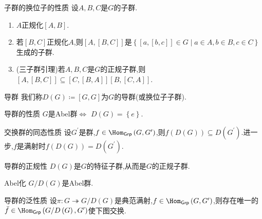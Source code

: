 \begin{proposition}{子群的换位子的性质}{}
	设$A,B,C$是$G$的子群.
	\begin{enumerate}
		\item $A$正规化$\left[A,B\right]$.
		\item 若$\left[B,C\right]$正规化$A$,则$\left[A,\left[B,C\right]\right]$是$\left\{\left[a,\left[b,c\right]\right]\in G\middle|a\in A,b\in B,c\in C\right\}$生成的子群.
		\item (三子群引理)若$A,B,C$是$G$的正规子群,则$\left[A,\left[B,C\right]\right]\subseteq\left[C,\left[B,A\right]\right]\left[B,\left[C,A\right]\right]$.
	\end{enumerate}
\end{proposition}

\begin{definition}{导群}{}
	我们称$D\left(G\right)\coloneq\left[G,G\right]$为$G$的导群(或换位子子群).
\end{definition}

\begin{proposition}{导群的性质}{}
	$G$是Abel群$\iff$ $D\left(G\right)=\left\{e\right\}$.
\end{proposition}

\begin{proposition}{交换群的同态性质}{}
	设$G^{\prime}$是群,$f\in\Hom_{\mathsf{Grp}}\left(G,G^{\prime}\right)$,则$f\left(D\left(G\right)\right)\subseteq D\left(G^{\prime}\right)$.进一步,$f$是满射时$f\left(D\left(G\right)\right)=D\left(G^{\prime}\right)$.
\end{proposition}

\begin{corollary}{导群的正规性}{}
	$D\left(G\right)$是$G$的特征子群,从而是$G$的正规子群.
\end{corollary}

\begin{corollary}{Abel化}{}
	$G/D\left(G\right)$是Abel群.
\end{corollary}

\begin{corollary}{导群的泛性质}{}
	设$\pi:G\twoheadrightarrow G/D\left(G\right)$是典范满射,$f\in\Hom_{\mathsf{Grp}}\left(G,G^{\prime}\right)$,则存在唯一的$\bar{f}\in\Hom_{\mathsf{Grp}}\left(G/D\left(G\right),G^{\prime}\right)$使下图交换.
	\begin{center}
	\end{center}
\end{corollary}


